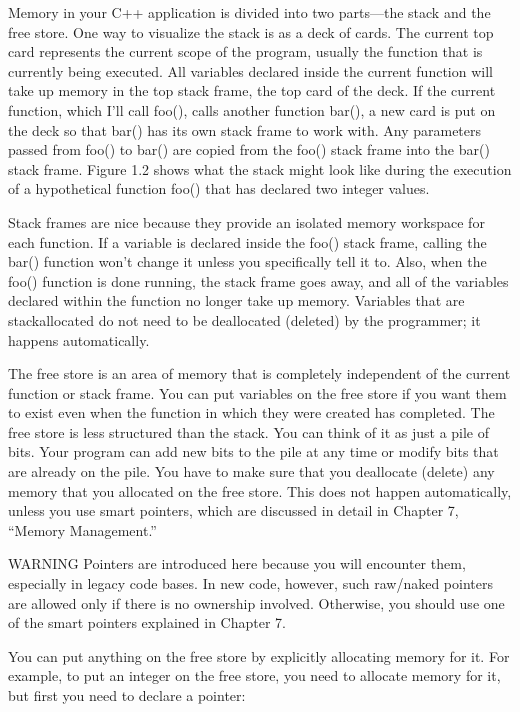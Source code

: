 Memory in your C++ application is divided into two parts—the stack and the free store. One way to visualize the stack is as a deck of cards. The current top card represents the current scope of the program, usually the function that is currently being executed. All variables declared inside the current function will take up memory in the top stack frame, the top card of the deck. If the current function, which I’ll call foo(), calls another function bar(), a new card is put on the deck so that bar() has its own stack frame to work with. Any parameters passed from foo() to bar() are copied from the foo() stack frame into the bar() stack frame. Figure 1.2 shows what the stack might look like during the execution of a hypothetical function foo() that has declared two integer values.

Stack frames are nice because they provide an isolated memory workspace for each function. If a variable is declared inside the foo() stack frame, calling the bar() function won’t change it unless you specifically tell it to. Also, when the foo() function is done running, the stack frame goes away, and all of the variables declared within the function no longer take up memory. Variables that are stackallocated do not need to be deallocated (deleted) by the programmer; it happens automatically.

The free store is an area of memory that is completely independent of the current function or stack frame. You can put variables on the free store if you want them to exist even when the function in which they were created has completed. The free store is less structured than the stack. You can think of it as just a pile of bits. Your program can add new bits to the pile at any time or modify bits that are already on the pile. You have to make sure that you deallocate (delete) any memory that you allocated on the free store. This does not happen automatically, unless you use smart pointers, which are discussed in detail in Chapter 7, “Memory Management.”

\begin{myWarning}{WARNING}
Pointers are introduced here because you will encounter them, especially in legacy code bases. In new code, however, such raw/naked pointers are allowed only if there is no ownership involved. Otherwise, you should use one of the smart pointers explained in Chapter 7.
\end{myWarning}


You can put anything on the free store by explicitly allocating memory for it. For example, to put an integer on the free store, you need to allocate memory for it, but first you need to declare a pointer:

